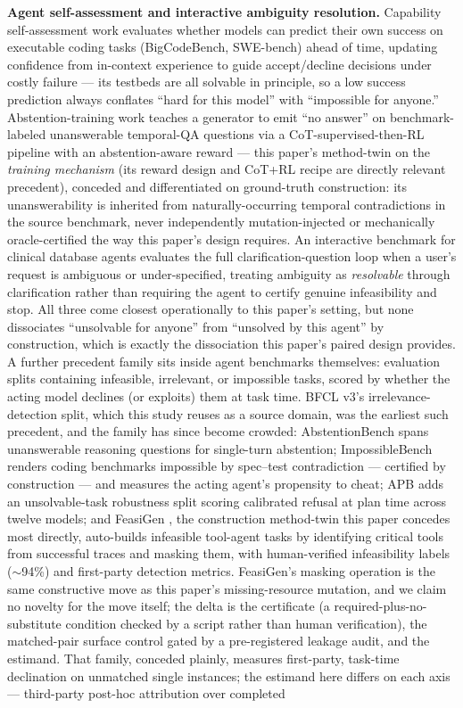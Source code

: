 \documentclass[11pt]{article}
\begin{document}
\textbf{Agent self-assessment and interactive ambiguity resolution.} Capability self-assessment work \citep{KnowCapable4661} evaluates whether models can predict their own success on executable coding tasks (BigCodeBench, SWE-bench) ahead of time, updating confidence from in-context experience to guide accept/decline decisions under costly failure --- its testbeds are all solvable in principle, so a low success prediction always conflates ``hard for this model'' with ``impossible for anyone.'' Abstention-training work \citep{SilenceGold0yf} teaches a generator to emit ``no answer'' on benchmark-labeled unanswerable temporal-QA questions via a CoT-supervised-then-RL pipeline with an abstention-aware reward --- this paper's method-twin on the \emph{training mechanism} (its reward design and CoT+RL recipe are directly relevant precedent), conceded and differentiated on ground-truth construction: its unanswerability is inherited from naturally-occurring temporal contradictions in the source benchmark, never independently mutation-injected or mechanically oracle-certified the way this paper's design requires. An interactive benchmark for clinical database agents \citep{EHRChatQABz7k} evaluates the full clarification-question loop when a user's request is ambiguous or under-specified, treating ambiguity as \emph{resolvable} through clarification rather than requiring the agent to certify genuine infeasibility and stop. All three come closest operationally to this paper's setting, but none dissociates ``unsolvable for anyone'' from ``unsolved by this agent'' by construction, which is exactly the dissociation this paper's paired design provides. A further precedent family sits inside agent benchmarks themselves: evaluation splits containing infeasible, irrelevant, or impossible tasks, scored by whether the acting model declines (or exploits) them at task time. BFCL v3's irrelevance-detection split, which this study reuses as a source domain, was the earliest such precedent, and the family has since become crowded: AbstentionBench \citep{AbstentionBench9038} spans unanswerable reasoning questions for single-turn abstention; ImpossibleBench \citep{ImpossibleBench0270} renders coding benchmarks impossible by spec--test contradiction --- certified by construction --- and measures the acting agent's propensity to cheat; APB \citep{APB4874} adds an unsolvable-task robustness split scoring calibrated refusal at plan time across twelve models; and FeasiGen \citep{FeasiGen8532}, the construction method-twin this paper concedes most directly, auto-builds infeasible tool-agent tasks by identifying critical tools from successful traces and masking them, with human-verified infeasibility labels ($\sim$94\%) and first-party detection metrics. FeasiGen's masking operation is the same constructive move as this paper's missing-resource mutation, and we claim no novelty for the move itself; the delta is the certificate (a required-plus-no-substitute condition checked by a script rather than human verification), the matched-pair surface control gated by a pre-registered leakage audit, and the estimand. That family, conceded plainly, measures first-party, task-time declination on unmatched single instances; the estimand here differs on each axis --- third-party post-hoc attribution over completed 
\end{document}
